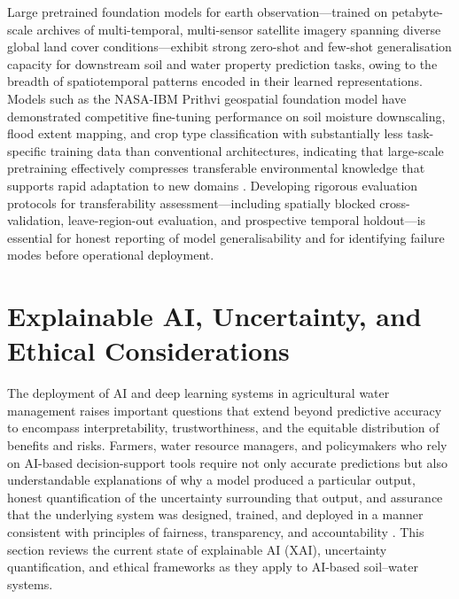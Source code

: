 \documentclass[land,article,submit,pdftex,moreauthors]{Definitions/mdpi}
\numberwithin{equation}{section}
\begin{document}
Large pretrained foundation models for earth observation---trained on petabyte-scale archives of multi-temporal, multi-sensor satellite imagery spanning diverse global land cover conditions---exhibit strong zero-shot and few-shot generalisation capacity for downstream soil and water property prediction tasks, owing to the breadth of spatiotemporal patterns encoded in their learned representations. Models such as the NASA-IBM Prithvi geospatial foundation model have demonstrated competitive fine-tuning performance on soil moisture downscaling, flood extent mapping, and crop type classification with substantially less task-specific training data than conventional architectures, indicating that large-scale pretraining effectively compresses transferable environmental knowledge that supports rapid adaptation to new domains \citep{jakubik2023foundation}. Developing rigorous evaluation protocols for transferability assessment---including spatially blocked cross-validation, leave-region-out evaluation, and prospective temporal holdout---is essential for honest reporting of model generalisability and for identifying failure modes before operational deployment.


\section{Explainable AI, Uncertainty, and Ethical Considerations}

The deployment of AI and deep learning systems in agricultural water management raises important questions that extend beyond predictive accuracy to encompass interpretability, trustworthiness, and the equitable distribution of benefits and risks. Farmers, water resource managers, and policymakers who rely on AI-based decision-support tools require not only accurate predictions but also understandable explanations of why a model produced a particular output, honest quantification of the uncertainty surrounding that output, and assurance that the underlying system was designed, trained, and deployed in a manner consistent with principles of fairness, transparency, and accountability \citep{adadi2018peeking, arrieta2020explainable}. This section reviews the current state of explainable AI (XAI), uncertainty quantification, and ethical frameworks as they apply to AI-based soil--water systems.
\end{document}

